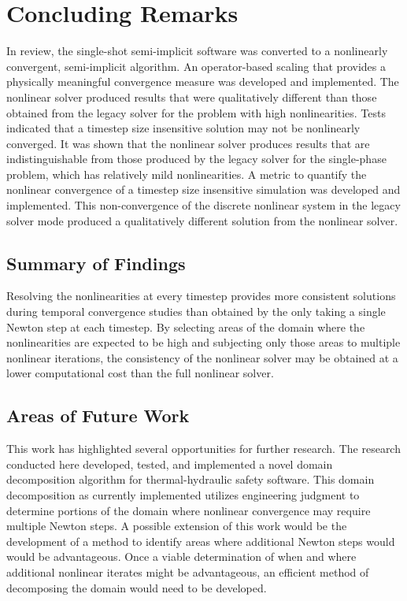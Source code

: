 \chapter{Concluding Remarks}
\label{chap:end}
In review, the single-shot semi-implicit \cobra{} software was converted to a nonlinearly convergent, semi-implicit algorithm.
An operator-based scaling that provides a physically meaningful convergence measure was developed and implemented.
The nonlinear solver produced results that were qualitatively different than those obtained from the legacy solver for the problem with high nonlinearities.
Tests indicated that a timestep size insensitive solution may not be nonlinearly converged.
It was shown that the nonlinear solver produces results that are indistinguishable from those produced by the legacy solver for the single-phase problem, which has relatively mild nonlinearities.
A metric to quantify the nonlinear convergence of a timestep size insensitive simulation was developed and implemented.
This non-convergence of the discrete nonlinear system in the legacy solver mode produced a qualitatively different solution from the nonlinear solver.

\section{Summary of Findings}
\label{sect:end:summary}
Resolving the nonlinearities at every timestep provides more consistent solutions during temporal convergence studies than obtained by the only taking a single Newton step at each timestep.
By selecting areas of the domain where the nonlinearities are expected to be high and subjecting only those areas to multiple nonlinear iterations, the consistency of the nonlinear solver may be obtained at a lower computational cost than the full nonlinear solver.

\section{Areas of Future Work}
\label{sect:futureWork}
This work has highlighted several opportunities for further research.
The research conducted here developed, tested, and implemented a novel domain decomposition algorithm for thermal-hydraulic safety software.
This domain decomposition as currently implemented utilizes engineering judgment to determine portions of the domain where nonlinear convergence may require multiple Newton steps.
A possible extension of this work would be the development of a method to identify areas where additional Newton steps would would be advantageous.
Once a viable determination of when and where additional nonlinear iterates might be advantageous, an efficient method of decomposing the domain would need to be developed.

